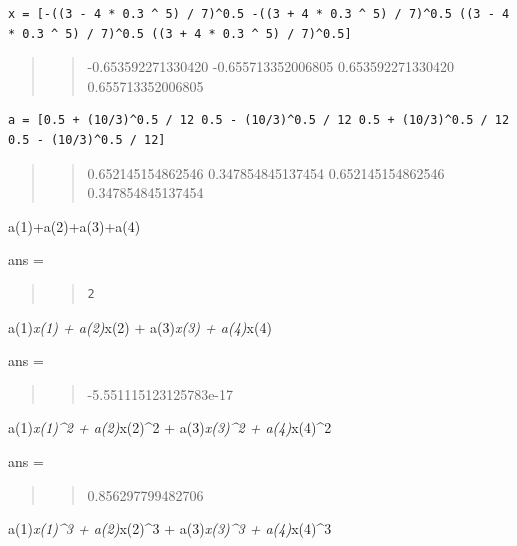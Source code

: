 \documentclass[]{article}
\begin{document}
\begin{verbatim}
x = [-((3 - 4 * 0.3 ^ 5) / 7)^0.5 -((3 + 4 * 0.3 ^ 5) / 7)^0.5 ((3 - 4 * 0.3 ^ 5) / 7)^0.5 ((3 + 4 * 0.3 ^ 5) / 7)^0.5]
\end{verbatim}

\begin{quote}
\begin{quote}
-0.653592271330420 -0.655713352006805 0.653592271330420
0.655713352006805
\end{quote}
\end{quote}

\begin{verbatim}
a = [0.5 + (10/3)^0.5 / 12 0.5 - (10/3)^0.5 / 12 0.5 + (10/3)^0.5 / 12 0.5 - (10/3)^0.5 / 12]
\end{verbatim}

\begin{quote}
\begin{quote}
0.652145154862546 0.347854845137454 0.652145154862546 0.347854845137454
\end{quote}
\end{quote}

a(1)+a(2)+a(3)+a(4)

ans =

\begin{quote}
\begin{quote}
\begin{verbatim}
2
\end{verbatim}
\end{quote}
\end{quote}

a(1)\emph{x(1) + a(2)}x(2) + a(3)\emph{x(3) + a(4)}x(4)

ans =

\begin{quote}
\begin{quote}
-5.551115123125783e-17
\end{quote}
\end{quote}

a(1)\emph{x(1)\^{}2 + a(2)}x(2)\^{}2 + a(3)\emph{x(3)\^{}2 +
a(4)}x(4)\^{}2

ans =

\begin{quote}
\begin{quote}
0.856297799482706
\end{quote}
\end{quote}

a(1)\emph{x(1)\^{}3 + a(2)}x(2)\^{}3 + a(3)\emph{x(3)\^{}3 +
a(4)}x(4)\^{}3
\end{document}
